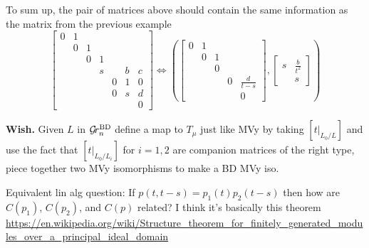 \begin{example}
    To sum up, the pair of matrices above should contain the same information as the matrix from the previous example 
    \[
    \begin{bmatrix}
    0 & 1 \\
      & 0 & 1 \\
      &   & 0 & 1 \\
      &   &   & s &  & b & c \\
      &   &   &   & 0 & 1 & 0 \\
      &   &   &   & 0 & s & d \\
      &   &   &   &   &   & 0
    \end{bmatrix} \Leftrightarrow \left( \begin{bmatrix}
            0 & 1\\
              & 0 & 1\\
              &   & 0 &  &  \\
              & & & 0 & \frac d {t-s} \\
              & & & & 0  
        \end{bmatrix} , \begin{bmatrix}
        s & \frac b {t^2} \\ & s 
        \end{bmatrix}\right) 
    \] 
\end{example}

{\bf Wish.} Given $L$ in ${\mathcal G\!r^{\text{BD}}_{n}}$ define a map to $T_\mu$ just like MVy by taking $[t\big|_{L_0/L}]$ and use the fact that $[t\big|_{L_0/L_i}]$ for $i = 1,2$ are companion matrices of the right type, piece together two MVy isomorphisms to make a BD MVy iso. 

Equivalent lin alg question: If $p(t,t-s) = p_1(t)p_2(t-s)$ then how are $C(p_1)$, $C(p_2)$, and $C(p)$ related? I think it's basically this theorem \url{https://en.wikipedia.org/wiki/Structure_theorem_for_finitely_generated_modules_over_a_principal_ideal_domain} 

